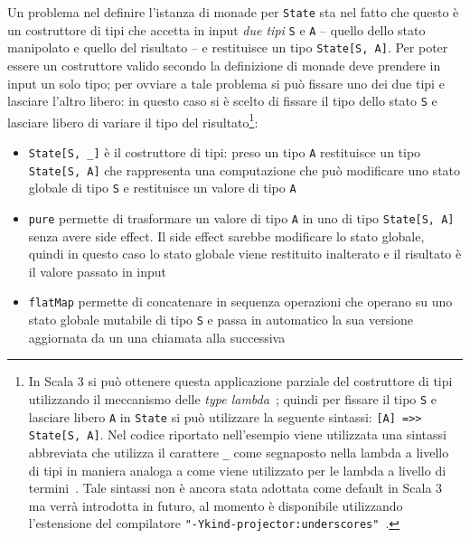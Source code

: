 Un problema nel definire l'istanza di monade per \lstinline{State} sta nel fatto che questo è un costruttore di tipi che accetta in input \emph{due tipi} \lstinline{S} e \lstinline{A} -- quello dello stato manipolato e quello del risultato -- e restituisce un tipo \lstinline{State[S, A]}. Per poter essere un costruttore valido secondo la definizione di monade deve prendere in input un solo tipo; per ovviare a tale problema si può fissare uno dei due tipi e lasciare l'altro libero: in questo caso si è scelto di fissare il tipo dello stato \lstinline{S} e lasciare libero di variare il tipo del risultato\footnote{In Scala 3 si può ottenere questa applicazione parziale del costruttore di tipi utilizzando il meccanismo delle \emph{type lambda}~\cite{cit:scala-reference-type-lambdas}; quindi per fissare il tipo \lstinline{S} e lasciare libero \lstinline{A} in \lstinline{State} si può utilizzare la seguente sintassi: \lstinline{[A] =>> State[S, A]}. Nel codice riportato nell'esempio viene utilizzata una sintassi abbreviata che utilizza il carattere \lstinline{_} come segnaposto nella lambda a livello di tipi in maniera analoga a come viene utilizzato per le lambda a livello di termini~\cite{cit:scala-reference-wildcard-arguments-in-types}. Tale sintassi non è ancora stata adottata come default in Scala 3 ma verrà introdotta in futuro, al momento è disponibile utilizzando l'estensione del compilatore \lstinline{"-Ykind-projector:underscores"}~\cite{cit:scala-reference-kind-projector-migration}.}:

\begin{itemize}
  \item \lstinline{State[S, _]} è il costruttore di tipi: preso un tipo \lstinline{A} restituisce un tipo \lstinline{State[S, A]} che rappresenta una computazione che può modificare uno stato globale di tipo \lstinline{S} e restituisce un valore di tipo \lstinline{A}
  \item \lstinline{pure} permette di trasformare un valore di tipo  \lstinline{A} in uno di tipo \lstinline{State[S, A]} senza avere side effect. Il side effect sarebbe modificare lo stato globale, quindi in questo caso lo stato globale viene restituito inalterato e il risultato è il valore passato in input
  \item \lstinline{flatMap} permette di concatenare in sequenza operazioni che operano su uno stato globale mutabile di tipo \lstinline{S} e passa in automatico la sua versione aggiornata da un una chiamata alla successiva
\end{itemize}

